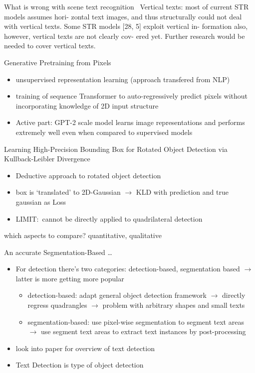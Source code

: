 What is wrong with scene text recognition~\cite{baek_what_2019}
Vertical texts: most of current STR models assumes hori-
zontal text images, and thus structurally could not deal with
vertical texts. Some STR models [28, 5] exploit vertical in-
formation also, however, vertical texts are not clearly cov-
ered yet. Further research would be needed to cover vertical
texts.


Generative Pretraining from Pixels~\citep{chen_generative_2021}
\begin{itemize}
    \item unsupervised representation learning (approach transfered from NLP)
    \item training of sequence Transformer to auto-regressively predict pixels without incorporating
        knowledge of 2D input structure
    \item Active part: GPT-2 scale model learns image representations and performs extremely well even
        when compared to supervised models
\end{itemize}

Learning High-Precision Bounding Box for Rotated Object Detection via Kullback-Leibler
Divergence~\citep{yang_learning_2021}
\begin{itemize}
    \item Deductive approach to rotated object detection
    \item box is `translated' to 2D-Gaussian $\rightarrow$ KLD with prediction and true gaussian as Loss
    \item LIMIT:\ cannot be directly applied to quadrilateral detection
\end{itemize}

which aspects to compare? quantitative, qualitative


An accurate Segmentation-Based \ldots~\citep{liu_accurate_2020}
\begin{itemize}
    \item For detection there's two categories: detection-based, segmentation based
        $\rightarrow$ latter is more getting more popular
        \begin{itemize}
            \item detection-based: adapt general object detection framework
                $\rightarrow$ directly regress quadrangles
                $\rightarrow$ problem with arbitrary shapes and small texts
            \item segmentation-based: use pixel-wise segmentation to segment text areas
                $\rightarrow$ use segment text areas to extract text instances by post-processing
        \end{itemize}
    \item look into paper for overview of text detection
    \item Text Detection is type of object detection
\end{itemize}

